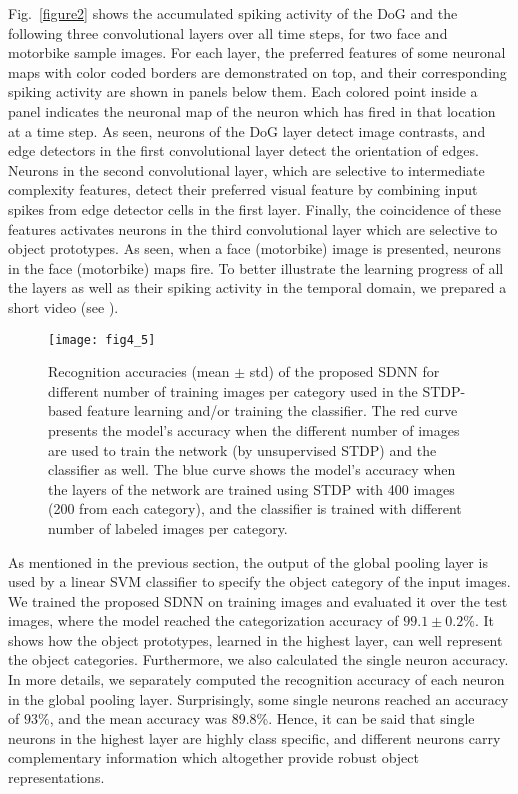 \documentclass[preprint,5p,12pt,twocolumn]{article}
\begin{document}
Fig.~\ref{figure2} shows the accumulated spiking activity of the DoG and the following three convolutional layers over all time steps, for two face and motorbike sample images. For each layer, the preferred features of some neuronal maps with color coded borders are demonstrated on top, and their corresponding spiking activity are shown in  panels below them. Each colored point inside a panel indicates the neuronal map of the neuron which has fired in that location at a time step. As seen, neurons of the DoG layer detect image contrasts, and edge detectors in the first convolutional layer detect the orientation of edges. Neurons in the second convolutional layer, which are selective to intermediate complexity features, detect their preferred visual feature by combining input spikes from edge detector cells in the first layer. Finally, the coincidence of these features activates neurons in the third convolutional layer which are selective to object prototypes.  As seen, when a face (motorbike) image is presented, neurons in the face (motorbike) maps fire. To better illustrate the learning progress of all the layers as well as their spiking activity in the temporal domain, we prepared a short video (see ). %

\begin{figure}[!tb]
\centering
\texttt{[image: fig4\_5]}
\caption{ Recognition accuracies (mean $\pm$ std) of the proposed SDNN for different number of training images per category used in  the STDP-based feature learning and/or training the classifier. The red curve presents the model's accuracy when the different number of images are used to train the network (by unsupervised STDP) and the classifier as well. The blue curve shows the model's accuracy when the layers of the network are trained using STDP with 400 images (200 from each category), and the classifier is trained with different number of labeled images per category.}
\label{figure2_5}
\end{figure}



As mentioned in the previous section, the output of the global pooling layer is used by a linear SVM classifier to specify the object category of the input images. We trained the proposed SDNN on training images and evaluated it over the test images, where the model reached the categorization accuracy of $99.1\pm 0.2\%$. It shows how the object prototypes, learned in the highest layer, can well represent the object categories. Furthermore, we also calculated the  single neuron accuracy. In more details, we separately computed the recognition accuracy of each neuron in the global pooling layer. Surprisingly, some single neurons reached an accuracy of $93\%$,  and the mean accuracy was 89.8\%. Hence, it can be said that single neurons in the highest layer are highly class specific, and different neurons carry complementary information which altogether provide robust object representations.
\end{document}
